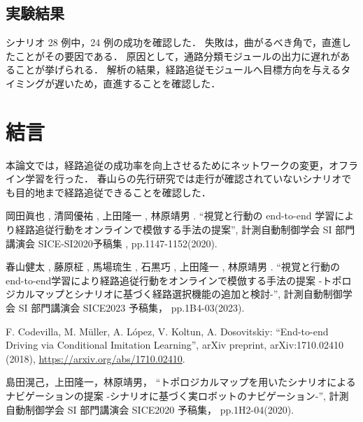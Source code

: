 \documentclass[10pt]{jarticle}
\begin{document}
    \subsection{実験結果}
    シナリオ 28 例中，24 例の成功を確認した．
    失敗は，曲がるべき角で，直進したことがその要因である．
    原因として，通路分類モジュールの出力に遅れがあることが挙げられる．
    解析の結果，経路追従モジュールへ目標方向を与えるタイミングが遅いため，直進することを確認した．

    \section{結\hspace{2zw}言}%
    本論文では，経路追従の成功率を向上させるためにネットワークの変更，オフライン学習を行った．
    春山らの先行研究では走行が確認されていないシナリオでも目的地まで経路追従できることを確認した．


    \vspace{5truemm}
    {\footnotesize
        \begin{thebibliography}{99}
            
            岡田眞也 , 清岡優祐 , 上田隆一 , 林原靖男 .
            ``視覚と行動の end-to-end 学習により経路追従行動をオンラインで模倣する手法の提案'',
            計測自動制御学会 SI 部門講演会 SICE-SI2020予稿集 , 
            pp.1147-1152(2020).

            春山健太 , 藤原柾 , 馬場琉生 , 石黒巧 , 上田隆一 , 林原靖男 .
            ``視覚と行動のend-to-end学習により経路追従行動をオンラインで模倣する手法の提案 -トポロジカルマップとシナリオに基づく経路選択機能の追加と検討-'',
            計測自動制御学会 SI 部門講演会 SICE2023 予稿集，
            pp.1B4-03(2023).
       
            F. Codevilla, M. Müller, A. López, V. Koltun, A. Dosovitskiy: 
            ``End-to-end Driving via Conditional Imitation Learning'', 
            arXiv preprint, arXiv:1710.02410 (2018), 
            \url{https://arxiv.org/abs/1710.02410}.

            島田滉己，上田隆一，林原靖男，
            ``トポロジカルマップを用いたシナリオによるナビゲーションの提案 -シナリオに基づく実ロボットのナビゲーション-'',
            計測自動制御学会 SI 部門講演会 SICE2020 予稿集，
            pp.1H2-04(2020).



        \end{thebibliography}
    }
    \normalsize
    
\end{document}
